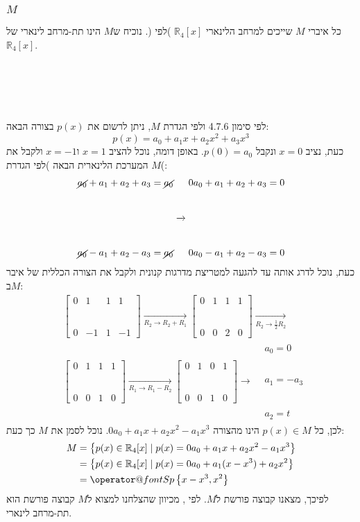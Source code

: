 \documentclass[11pt, oneside]{article}
\makeatletter
\newcommand{\qed}{\R{$\blacksquare$}}
\newcommand{\br}{\\\\\\\\\\\\}
\newcommand{\opr}[1]{\xrightarrow[\text{#1}]{}}
\newcommand{\mR}{\mathbb{R}}
\newcommand{\q}[3]{\R{שאלה #3#2.#1}}
\newcommand{\m}[3]{\R{משפט #3#2.#1}}
\newcommand{\Sp}[1]{\mathop{\operator@font Sp}#1}
\makeatother
\begin{document}
\subsubsection{$M$}
כל איברי $M$ שייכים למרחב הלינארי $\mR_4[x]$ )לפי \q{7}{1}{9.}(. נוכיח ש$M$ הינו תת-מרחב לינארי של $\mR_4[x]$.
\br
לפי סימון 4.7.6 ולפי הגדרת $M$, ניתן לרשום את $p(x)$ בצורה הבאה:
$$p(x) = a_0 + a_1x + a_2x^2 + a_3x^3$$
כעת, נציב $x = 0$ ונקבל $p(0) = a_0$. באופן דומה, נוכל להציב $x = 1$ ו$x = -1$ ולקבל את המערכת הלינארית הבאה )לפי הגדרת $M$(:
\begin{eqnarray*}
\begin{matrix}
\cancel{a_0} + a_1 + a_2 + a_3 = \cancel{a_0}\br
\cancel{a_0} - a_1 + a_2 - a_3 = \cancel{a_0}
\end{matrix}
\opr{}
\begin{matrix}
0a_0 + a_1 + a_2 + a_3 = 0\br
0a_0 - a_1 + a_2 - a_3 = 0
\end{matrix}
\end{eqnarray*}
\clearpage
כעת, נוכל לדרג אותה עד להגעה למטריצת מדרגות קנונית ולקבל את הצורה הכללית של איבר ב$M$:
\begin{align*}
& \begin{bmatrix}
0 & 1 & 1 & 1\br
0 & -1 & 1 & -1
\end{bmatrix}
\opr{$R_2 \opr{} R_2 + R_1$}
\begin{bmatrix}
0 & 1 & 1 & 1\br
0 & 0 & 2 & 0
\end{bmatrix}
\opr{$R_2 \opr{} \frac{1}{2}R_2$}\\
& \begin{bmatrix}
0 & 1 & 1 & 1\br
0 & 0 & 1 & 0
\end{bmatrix}
\opr{$R_1 \opr{} R_1 - R_2$}
\begin{bmatrix}
0 & 1 & 0 & 1\br
0 & 0 & 1 & 0
\end{bmatrix}
\opr{}
\begin{matrix}
& a_0 = 0\br
& a_1 = -a_3\br
& a_2 = t
\end{matrix}
\end{align*}
לכן, כל $p(x) \in M$ הינו מהצורה $0a_0 + a_1x + a_2x^2 - a_1x^3$. נוכל לסמן את $M$ כך כעת:
\begin{align*}
M
& = \left\{p(x) \in \mR_4[x] \mid p(x) = 0a_0 + a_1x + a_2x^2 - a_1x^3 \right\}\\
& = \left\{p(x) \in \mR_4[x] \mid p(x) = 0a_0 + a_1(x - x^3) + a_2x^2 \right\}\\
& = \Sp\left\{x - x^3, x^2\right\}
\end{align*}
לפיכך, מצאנו קבוצה פורשת ל$M$. לפי \m{7}{5}{1.}, מכיוון שהצלחנו למצוא ל$M$ קבוצה פורשת הוא תת-מרחב לינארי.
\br\qed
\end{document}
